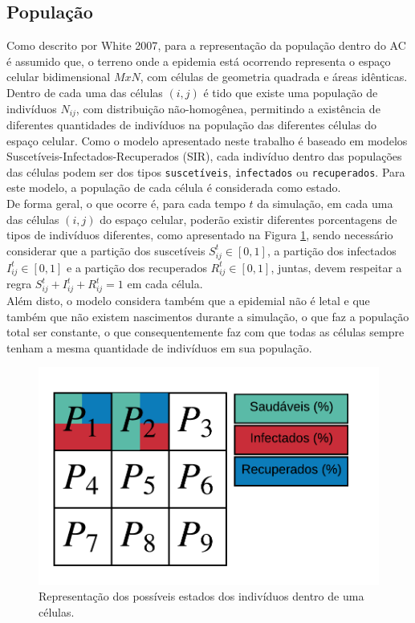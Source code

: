 \documentclass[a4paper,12pt]{article}
\begin{document}
\subsection{População}
Como descrito por White 2007\cite{White2007}, para a representação da população dentro do AC é assumido que, o terreno onde a epidemia está ocorrendo representa o espaço celular bidimensional $MxN$, com células de geometria quadrada e áreas idênticas. Dentro de cada uma das células $(i,j)$ é tido que existe uma população de indivíduos $N_{ij}$, com distribuição não-homogênea, permitindo a existência de diferentes quantidades de indivíduos na população das diferentes células do espaço celular. Como o modelo apresentado neste trabalho é baseado em modelos Suscetíveis-Infectados-Recuperados (SIR), cada indivíduo dentro das populações das células podem ser dos tipos \texttt{suscetíveis}, \texttt{infectados} ou \texttt{recuperados}. Para este modelo, a população de cada célula é considerada como estado.\\

De forma geral, o que ocorre é, para cada tempo $t$ da simulação, em cada uma das células $(i,j)$ do espaço celular, poderão existir diferentes porcentagens de tipos de indivíduos diferentes, como apresentado na Figura \ref{figure:cellArticle}, sendo necessário considerar que a partição dos suscetíveis $S_{ij}^t \in [0, 1]$, a partição dos infectados $I_{ij}^t \in [0, 1]$ e a partição dos recuperados $R_{ij}^t \in [0, 1]$, juntas, devem respeitar a regra $S_{ij}^t + I_{ij}^t + R_{ij}^t = 1$ em cada célula.\\

Além disto, o modelo considera também que a epidemial não é letal e que também que não existem nascimentos durante a simulação, o que faz a população total ser constante, o que consequentemente faz com que todas as células sempre tenham a mesma quantidade de indivíduos em sua população.

\begin{figure}[ht]
 \begin{center}
  \includegraphics[width=0.7\linewidth]{fig/modelo_ca_artigo_v2.png}
 \end{center}
 \caption{Representação dos possíveis estados dos indivíduos dentro de uma células.}
\label{figure:cellArticle}
\end{figure}
\end{document}
